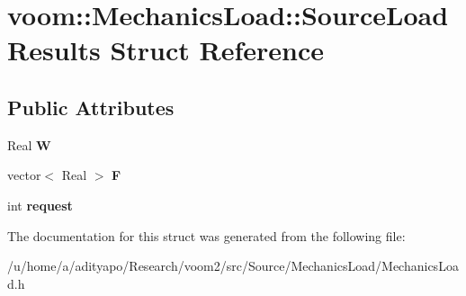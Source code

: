 \hypertarget{structvoom_1_1_mechanics_load_1_1_source_load_results}{
\section{voom::MechanicsLoad::SourceLoadResults Struct Reference}
\label{structvoom_1_1_mechanics_load_1_1_source_load_results}
}
\subsection*{Public Attributes}
\begin{DoxyCompactItemize}
\item 
\hypertarget{structvoom_1_1_mechanics_load_1_1_source_load_results_ac43e13a504f568f44905a739e0873af7}{
Real {\bfseries W}}
\label{structvoom_1_1_mechanics_load_1_1_source_load_results_ac43e13a504f568f44905a739e0873af7}

\item 
\hypertarget{structvoom_1_1_mechanics_load_1_1_source_load_results_ae4ebcc2c4643cde11db4575356d02ee5}{
vector$<$ Real $>$ {\bfseries F}}
\label{structvoom_1_1_mechanics_load_1_1_source_load_results_ae4ebcc2c4643cde11db4575356d02ee5}

\item 
\hypertarget{structvoom_1_1_mechanics_load_1_1_source_load_results_a59415873eaca4e29c3cbfb99501de065}{
int {\bfseries request}}
\label{structvoom_1_1_mechanics_load_1_1_source_load_results_a59415873eaca4e29c3cbfb99501de065}

\end{DoxyCompactItemize}


The documentation for this struct was generated from the following file:\begin{DoxyCompactItemize}
\item 
/u/home/a/adityapo/Research/voom2/src/Source/MechanicsLoad/MechanicsLoad.h\end{DoxyCompactItemize}
